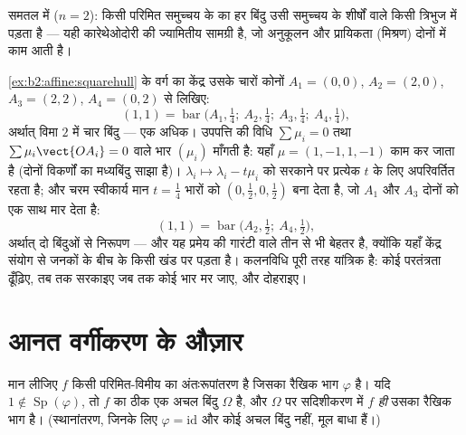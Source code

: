 \begin{example}
समतल में ($n = 2$): किसी परिमित समुच्चय के  का हर बिंदु उसी समुच्चय
के शीर्षों वाले किसी त्रिभुज में पड़ता है --- यही कारेथेओदोरी की ज्यामितीय
सामग्री है, जो अनुकूलन और प्रायिकता (मिश्रण) दोनों में काम आती है।
\end{example}

\begin{example}[कारेथेओदोरी की कलनविधि चलाकर]\label{ex:b2:affine:caratheodoryrun}
\cref{ex:b2:affine:squarehull} के वर्ग का केंद्र उसके चारों कोनों $A_1 =
(0,0)$, $A_2 = (2,0)$, $A_3 = (2,2)$, $A_4 = (0,2)$ से लिखिए:
\[
(1,1) = \operatorname{bar}\bigl(A_1, \tfrac14;\ A_2,
\tfrac14;\ A_3, \tfrac14;\ A_4, \tfrac14\bigr),
\]
अर्थात् विमा $2$ में चार बिंदु --- एक अधिक। उपपत्ति की विधि $\sum\mu_i = 0$ तथा $\sum\mu_i\vect{OA_i} = 0$
वाले भार $(\mu_i)$ माँगती है: यहाँ $\mu = (1, -1, 1, -1)$ काम कर जाता है (दोनों विकर्णों का
मध्यबिंदु साझा है)। $\lambda_i
\mapsto \lambda_i - t\mu_i$ को सरकाने पर प्रत्येक $t$ के लिए 
अपरिवर्तित रहता है; और चरम स्वीकार्य मान $t = \frac14$ भारों को $(0, \tfrac12, 0, \tfrac12)$ बना देता है,
जो $A_1$ और $A_3$ दोनों को एक साथ मार देता है:
\[
(1,1) = \operatorname{bar}\bigl(A_2, \tfrac12;\ A_4,
\tfrac12\bigr),
\]
अर्थात् दो बिंदुओं से निरूपण --- और यह प्रमेय की गारंटी वाले तीन से भी
बेहतर है, क्योंकि यहाँ केंद्र संयोग से जनकों के बीच के किसी खंड पर पड़ता
है। कलनविधि पूरी तरह यांत्रिक है: कोई परतंत्रता ढूँढ़िए, तब तक सरकाइए जब
तक कोई भार मर जाए, और दोहराइए।
\end{example}

\section{आनत वर्गीकरण के औज़ार}

\begin{proposition}\label{prop:b2:affine:fixedpoint}
मान लीजिए $f$ किसी परिमित-विमीय  का  अंतःरूपांतरण है जिसका
रैखिक भाग $\varphi$ है। यदि $1 \notin
\operatorname{Sp}(\varphi)$, तो $f$ का ठीक एक अचल बिंदु $\Omega$ है, और $\Omega$ पर
सदिशीकरण में $f$ \emph{ही} उसका रैखिक भाग है। (स्थानांतरण, जिनके लिए $\varphi = \mathrm{id}$
और कोई अचल बिंदु नहीं, मूल बाधा हैं।)
\end{proposition}

